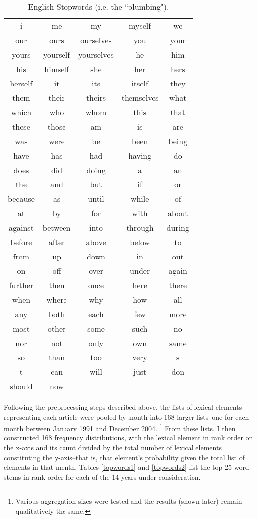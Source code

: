 \begin{table}[p!]
\begin{center}
\caption[English Stopwords]{English Stopwords (i.e. the ``plumbing"). \label{stop}}
\vspace{0.3in}
\begin{tabular}{ccccc}
\hline 
\hline
i & me & my & myself & we \\
our & ours & ourselves & you & your \\
yours & yourself & yourselves & he & him \\
his & himself & she & her & hers\\
herself & it & its & itself & they\\
them & their & theirs & themselves & what \\
which & who & whom & this & that \\
these & those & am & is & are\\
was & were & be & been & being \\
have & has & had & having & do\\
does & did & doing & a & an \\
the & and & but & if & or \\
because & as & until & while & of \\
at & by & for & with & about \\
against & between & into & through & during \\
before & after & above & below & to \\
from & up & down & in & out \\
on & off & over & under & again \\
further & then & once & here & there \\
when & where & why & how & all \\
any & both & each & few & more \\
most & other & some & such & no \\
nor & not & only & own & same \\
so & than & too & very & s \\
t & can & will & just & don \\
should & now & & & \\
\hline
\end{tabular}
\end{center}
\end{table}

Following the preprocessing steps described above, the lists of lexical elements representing each article were pooled by month into 168 larger lists--one for each month between January 1991 and December 2004. \footnote{Various aggregation sizes were tested and the results (shown later) remain qualitatively the same.} From these lists, I then constructed 168 frequency distributions, with the lexical element in rank order on the x-axis and its count divided by the total number of lexical elements constituting the y-axis--that is, that element's probability given the total list of elements in that month. Tables \ref{topwords1} and \ref{topwords2} list the top 25 word stems in rank order for each of the 14 years under consideration. 

